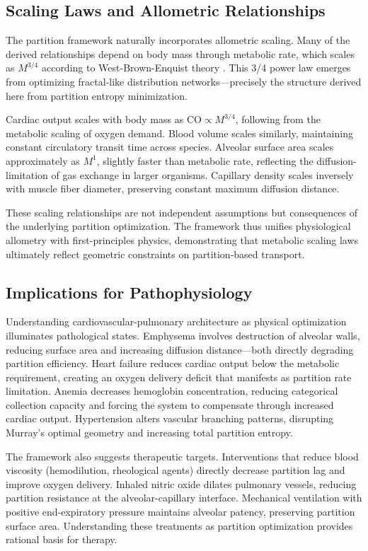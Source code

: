 \documentclass[10pt,twocolumn,a4paper]{article}
\theoremstyle{remark}
\begin{document}
\subsection{Scaling Laws and Allometric Relationships}

The partition framework naturally incorporates allometric scaling. Many of the derived relationships depend on body mass through metabolic rate, which scales as $M^{3/4}$ according to West-Brown-Enquist theory \cite{west1997general}. This 3/4 power law emerges from optimizing fractal-like distribution networks—precisely the structure derived here from partition entropy minimization.

Cardiac output scales with body mass as $\mathrm{CO} \propto M^{3/4}$, following from the metabolic scaling of oxygen demand. Blood volume scales similarly, maintaining constant circulatory transit time across species. Alveolar surface area scales approximately as $M^{1}$, slightly faster than metabolic rate, reflecting the diffusion-limitation of gas exchange in larger organisms. Capillary density scales inversely with muscle fiber diameter, preserving constant maximum diffusion distance.

These scaling relationships are not independent assumptions but consequences of the underlying partition optimization. The framework thus unifies physiological allometry with first-principles physics, demonstrating that metabolic scaling laws ultimately reflect geometric constraints on partition-based transport.

\subsection{Implications for Pathophysiology}

Understanding cardiovascular-pulmonary architecture as physical optimization illuminates pathological states. Emphysema involves destruction of alveolar walls, reducing surface area and increasing diffusion distance—both directly degrading partition efficiency. Heart failure reduces cardiac output below the metabolic requirement, creating an oxygen delivery deficit that manifests as partition rate limitation. Anemia decreases hemoglobin concentration, reducing categorical collection capacity and forcing the system to compensate through increased cardiac output. Hypertension alters vascular branching patterns, disrupting Murray's optimal geometry and increasing total partition entropy.

The framework also suggests therapeutic targets. Interventions that reduce blood viscosity (hemodilution, rheological agents) directly decrease partition lag and improve oxygen delivery. Inhaled nitric oxide dilates pulmonary vessels, reducing partition resistance at the alveolar-capillary interface. Mechanical ventilation with positive end-expiratory pressure maintains alveolar patency, preserving partition surface area. Understanding these treatments as partition optimization provides rational basis for therapy.
\end{document}
